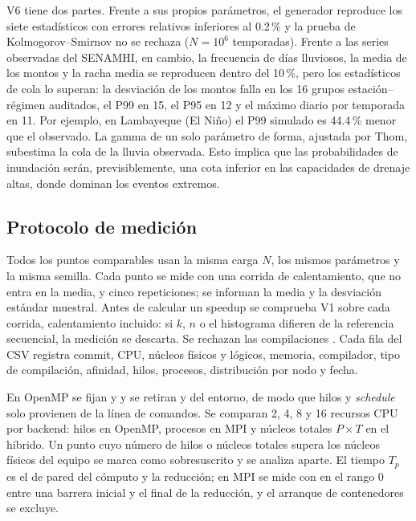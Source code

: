 V6 tiene dos partes. Frente a sus propios parámetros, el generador reproduce los siete estadísticos con errores relativos inferiores al \num{0.2}\,\% y la prueba de Kolmogorov--Smirnov no se rechaza ($N = 10^{6}$ temporadas). Frente a las series observadas del SENAMHI, en cambio, la frecuencia de días lluviosos, la media de los montos y la racha media se reproducen dentro del 10\,\%, pero los estadísticos de cola lo superan: la desviación de los montos falla en los 16 grupos estación--régimen auditados, el P99 en 15, el P95 en 12 y el máximo diario por temporada en 11. Por ejemplo, en Lambayeque (El Niño) el P99 simulado es \num{44.4}\,\% menor que el observado. La gamma de un solo parámetro de forma, ajustada por Thom, subestima la cola de la lluvia observada. Esto implica que las probabilidades de inundación serán, previsiblemente, una cota inferior en las capacidades de drenaje altas, donde dominan los eventos extremos.

\subsection{Protocolo de medición}

Todos los puntos comparables usan la misma carga $N$, los mismos parámetros y la misma semilla. Cada punto se mide con una corrida de calentamiento, que no entra en la media, y cinco repeticiones; se informan la media y la desviación estándar muestral. Antes de calcular un speedup se comprueba V1 sobre cada corrida, calentamiento incluido: si $k$, $n$ o el histograma difieren de la referencia secuencial, la medición se descarta. Se rechazan las compilaciones . Cada fila del CSV registra commit, CPU, núcleos físicos y lógicos, memoria, compilador, tipo de compilación, afinidad, hilos, procesos, distribución por nodo y fecha.

En OpenMP se fijan  y  y se retiran  y  del entorno, de modo que hilos y \emph{schedule} solo provienen de la línea de comandos. Se comparan 2, 4, 8 y 16 recursos CPU por backend: hilos en OpenMP, procesos en MPI y núcleos totales $P\times T$ en el híbrido. Un punto cuyo número de hilos o núcleos totales supera los núcleos físicos del equipo se marca como sobresuscrito y se analiza aparte. El tiempo $T_p$ es el de pared del cómputo y la reducción; en MPI se mide con  en el rango 0 entre una barrera inicial y el final de la reducción, y el arranque de contenedores se excluye.

